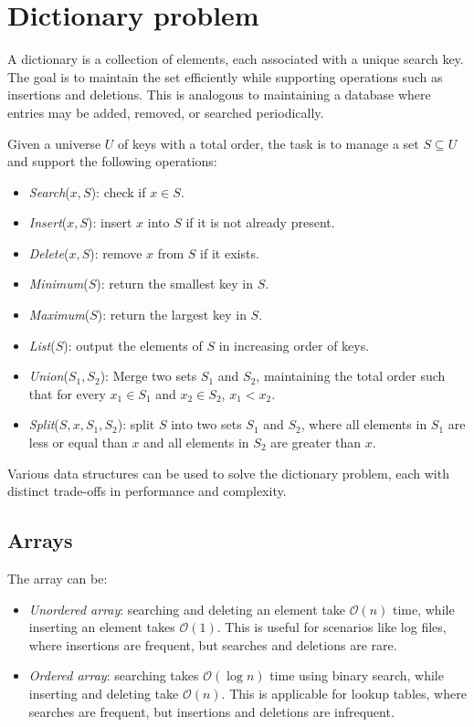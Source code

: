 \section{Dictionary problem}

A dictionary is a collection of elements, each associated with a unique search key.
The goal is to maintain the set efficiently while supporting operations such as insertions and deletions.
This is analogous to maintaining a database where entries may be added, removed, or searched periodically.

Given a universe $U$ of keys with a total order, the task is to manage a set $S \subseteq U$ and support the following operations:
\begin{itemize}
    \item \textit{Search}($x, S$): check if $x\in S$.
    \item \textit{Insert}($x, S$): insert $x$ into $S$ if it is not already present.
    \item \textit{Delete}($x, S$): remove $x$ from $S$ if it exists. 
    \item \textit{Minimum}($S$): return the smallest key in $S$.
    \item \textit{Maximum}($S$): return the largest key in $S$.
    \item \textit{List}($S$): output the elements of $S$ in increasing order of keys.
    \item \textit{Union}($S_1, S_2$): Merge two sets $S_1$ and $S_2$, maintaining the total order such that for every $x_1\in S_1$ and $x_2\in S_2$, $x_1<x_2$. 
    \item \textit{Split}($S, x, S_1, S_2$): split $S$ into two sets $S_1$ and $S_2$, where all elements in $S_1$ are less or equal than $x$ and all elements in $S_2$ are greater than $x$.
\end{itemize}
Various data structures can be used to solve the dictionary problem, each with distinct trade-offs in performance and complexity.

\subsection{Arrays}
The array can be: 
\begin{itemize} 
    \item \textit{Unordered array}: searching and deleting an element take $\mathcal{O}(n)$ time, while inserting an element takes $\mathcal{O}(1)$. 
        This is useful for scenarios like log files, where insertions are frequent, but searches and deletions are rare. 
    \item \textit{Ordered array}: searching takes $\mathcal{O}(\log n)$ time using binary search, while inserting and deleting take $\mathcal{O}(n)$. 
        This is applicable for lookup tables, where searches are frequent, but insertions and deletions are infrequent. 
\end{itemize}


